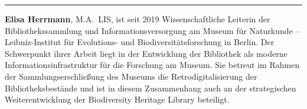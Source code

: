 \begin{center}\rule{0.5\linewidth}{0.5pt}\end{center}

\textbf{Elisa Herrmann}, M.A.~LIS, ist seit 2019
Wissenschaftliche Leiterin der Bibliothekssammlung und
Informationsversorgung am Museum für Naturkunde -- Leibniz-Institut für
Evolutions- und Biodiversitätsforschung in Berlin. Der Schwerpunkt ihrer
Arbeit liegt in der Entwicklung der Bibliothek als moderne
Informationsinfrastruktur für die Forschung am Museum. Sie betreut im
Rahmen der Sammlungserschließung des Museums die Retrodigitalisierung
der Bibliotheksbestände und ist in diesem Zusammenhang auch an der
strategischen Weiterentwicklung der Biodiversity Heritage Library
beteiligt.
